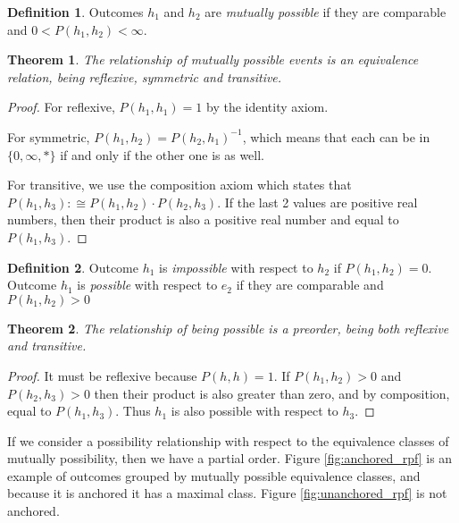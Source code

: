 \documentclass[twoside]{article}
\theoremstyle{plain}%
\newtheorem{theorem}{Theorem}[section]
\theoremstyle{definition}
\newtheorem{definition}{Definition}[section]
\theoremstyle{remark}
\begin{document}
\begin{definition}
Outcomes \(h_1\) and \(h_2\) are \textit{mutually possible} if they are comparable and \(0 < P(h_1, h_2) < \infty\).
\end{definition}

\begin{theorem}
The relationship of mutually possible events is an \textit{equivalence relation}, being reflexive, symmetric and transitive.
\end{theorem}

\begin{proof}
For reflexive, \(P(h_1, h_1) = 1\) by the identity axiom.

For symmetric, \(P(h_1, h_2) = P(h_2, h_1)^{-1}\), which means that each can be in \(\{0, \infty, \ast\}\) if and only if the other one is as well.

For transitive, we use the composition axiom which states that \(P(h_1, h_3) :\cong P(h_1, h_2) \cdot P(h_2, h_3)\). If the last 2 values are positive real numbers, then their product is also a positive real number and equal to \(P(h_1, h_3)\).
\end{proof}

\begin{definition}
Outcome \(h_1\) is \textit{impossible} with respect to \(h_2\) if \(P(h_1, h_2) = 0\). Outcome \(h_1\) is \textit{possible} with respect to \(e_2\) if they are comparable and \(P(h_1, h_2) > 0\)
\end{definition}

\begin{theorem}
The relationship of being possible is a \textit{preorder}, being both reflexive and transitive.
\end{theorem}

\begin{proof}
It must be reflexive because \(P(h, h) = 1\). If \(P(h_1, h_2) > 0\) and \(P(h_2, h_3) > 0\) then their product is also greater than zero, and by composition, equal to \(P(h_1, h_3)\). Thus \(h_1\) is also possible with respect to \(h_3\).
\end{proof}

If we consider a possibility relationship with respect to the equivalence classes of mutually possibility, then we have a partial order. Figure \ref{fig:anchored_rpf} is an example of outcomes grouped by mutually possible equivalence classes, and because it is anchored it has a maximal class. Figure \ref{fig:unanchored_rpf} is not anchored.
\end{document}
